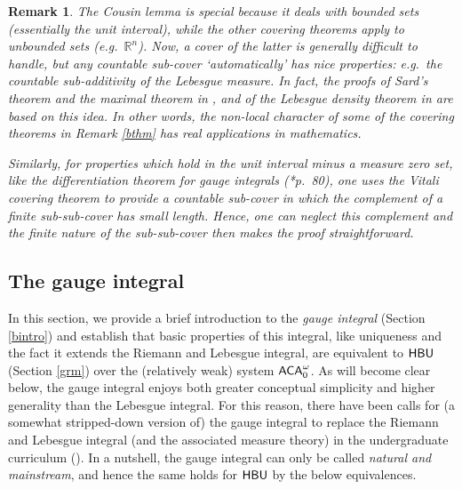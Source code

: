 \documentclass[reqno]{amsart}
\newtheorem{rem}[thm]{Remark}
\def\ACAo{\textup{\textsf{ACA}}_{0}^{\omega}}
\def\R{{\mathbb  R}}
\def\HBU{\textup{\textsf{HBU}}}
\numberwithin{equation}{section}
\numberwithin{thm}{section}
\begin{document}
\begin{rem}\label{popo}\rm
The Cousin lemma is special because it deals with bounded sets (essentially the unit interval), while the other covering theorems apply to unbounded sets (e.g.\ $\R^{n}$).  
Now, a cover of the latter is generally difficult to handle, but any \emph{countable} sub-cover `automatically' has nice properties: e.g.\ the \emph{countable} sub-additivity of the Lebesgue measure. 
In fact, the proofs of \emph{Sard's theorem} and the \emph{maximal theorem} in \cite{auke}, and of the \emph{Lebesgue density theorem} in \cite{grotesier} are based on this idea.  In other words, the non-local
character of some of the covering theorems  in Remark \ref{bthm} has real applications in mathematics.  

\smallskip

Similarly, for properties which hold in the unit interval \emph{minus a measure zero set}, like the \emph{differentiation theorem} for gauge integrals (\cite{bartle}*{p.\ 80}), one uses the Vitali covering theorem to provide a countable sub-cover in which the complement of a finite sub-sub-cover has small length.  Hence, one can neglect this complement and the finite nature of the sub-sub-cover then makes the proof straightforward.  
\end{rem}
\subsection{The gauge integral}\label{introgau}
In this section, we provide a brief introduction to the \emph{gauge integral} (Section \ref{bintro}) and establish that basic properties of this integral, like uniqueness and the fact it extends the Riemann and Lebesgue integral, are equivalent to $\HBU$ (Section \ref{grm}) over the (relatively weak) system $\ACAo$.  
As will become clear below, the gauge integral enjoys both greater conceptual simplicity and higher generality than the Lebesgue integral.  For this reason, there have been calls for (a somewhat stripped-down version of) the gauge integral to replace the Riemann and Lebesgue integral (and the associated measure theory) in the undergraduate curriculum (\cite{bartleol, bartleol2,bartleol3}).  In a nutshell, the gauge integral can only be called \emph{natural and mainstream}, and hence the same holds for $\HBU$ by the below equivalences.  
\end{document}

